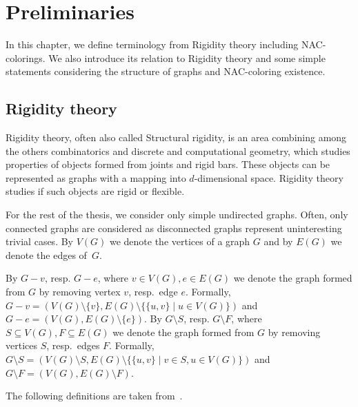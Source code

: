 
\chapter{Preliminaries}%
\label{chapter:preliminaries}

\begin{chapterabstract}

	In this chapter, we define terminology from Rigidity theory including NAC-colorings.
	We also introduce its relation to Rigidity theory and
	some simple statements considering
	the structure of graphs and NAC-coloring existence.

\end{chapterabstract}

\section{Rigidity theory}

Rigidity theory, often also called Structural rigidity,
is an area combining among the others
combinatorics and discrete and computational geometry,
which studies properties of objects formed from joints and rigid bars.
These objects can be represented as graphs with
a mapping into \( d \)-dimensional space.
Rigidity theory studies if such objects are rigid or flexible.

For the rest of the thesis,
we consider only simple undirected graphs.
Often, only connected graphs are considered as disconnected graphs
represent uninteresting trivial cases.
By \( V(G) \) we denote the vertices of a graph \( G \) and
by \( E(G) \) we denote the edges of~\( G \).

By \( G - v \), resp. \( G - e \),
where \( v \in V(G), e \in E(G) \) we denote the graph
formed from \( G \) by removing vertex \( v \), resp.\ edge \( e \).
Formally,
\( G - v = (V(G) \setminus \{v\}, E(G) \setminus \{\{u, v\} \mid u \in V(G)\}) \)
and \( G - e = (V(G), E(G) \setminus \{e\}) \).
%
By \( G \setminus S \), resp. \( G \setminus F \),
where \( S \subseteq V(G), F \subseteq E(G) \) we denote the graph
formed from \( G \) by removing vertices \( S \), resp.\ edges \( F \).
Formally,
\( G \setminus S = (V(G) \setminus S, E(G) \setminus \{\{u, v\} \mid v \in S, u \in V(G)\}) \)
and \( G \setminus F = (V(G), E(G) \setminus F) \).

The following definitions are taken from~\cite{np_complete,my_paper}.

